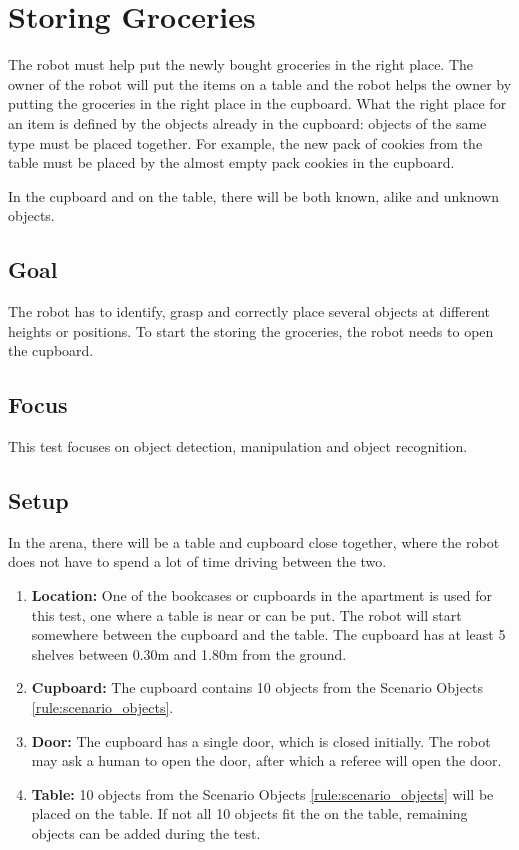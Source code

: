 \section{Storing Groceries}

The robot must help put the newly bought groceries in the right place.
The owner of the robot will put the items on a table and the robot helps the owner by putting the groceries in the right place in the cupboard.
What the right place for an item is defined by the objects already in the cupboard: objects of the same type must be placed together.
For example, the new pack of cookies from the table must be placed by the almost empty pack cookies in the cupboard.

In the cupboard and on the table, there will be both known, alike and unknown objects. 

\subsection{Goal}
The robot has to identify, grasp and correctly place several objects at different heights or positions.
To start the storing the groceries, the robot needs to open the cupboard. 

\subsection{Focus}
This test focuses on object detection, manipulation and object recognition.

\subsection{Setup}
In the arena, there will be a table and cupboard close together, where the robot does not have to spend a lot of time driving between the two. 

\begin{enumerate}
\item \textbf{Location:} One of the bookcases or cupboards in the apartment is used for this test, one where a table is near or can be put. 
The robot will start somewhere between the cupboard and the table. 
The cupboard has at least 5 shelves between 0.30m and 1.80m from the ground. 
\item \textbf{Cupboard:} The cupboard contains 10 objects from the Scenario Objects \ref{rule:scenario_objects}.
\item \textbf{Door:} The cupboard has a single door, which is closed initially.
The robot may ask a human to open the door, after which a referee will open the door. 
\item \textbf{Table:} 10 objects from the Scenario Objects \ref{rule:scenario_objects} will be placed on the table. If not all 10 objects fit the on the table, remaining objects can be added during the test.
\end{enumerate}

